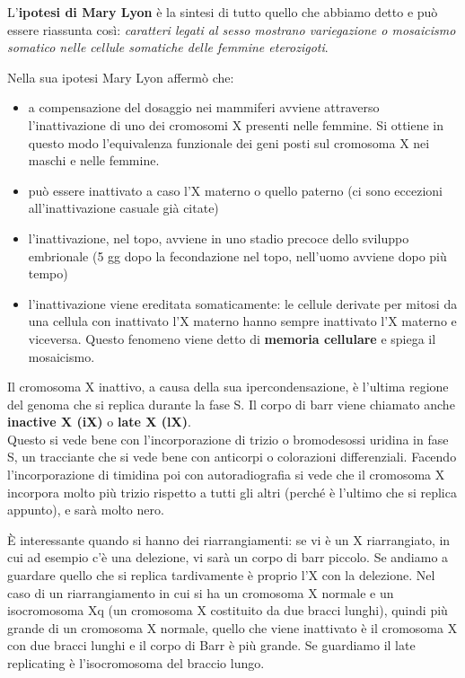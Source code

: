 \documentclass[11pt]{book}
\begin{document}
L’\textbf{ipotesi di Mary Lyon} è la sintesi di tutto quello che abbiamo detto e può essere riassunta così: \emph{caratteri legati al sesso mostrano variegazione o mosaicismo somatico nelle cellule somatiche delle femmine eterozigoti}.

Nella sua ipotesi Mary Lyon affermò che:
\begin{itemize}
\item a compensazione del dosaggio nei mammiferi avviene attraverso l’inattivazione di uno dei cromosomi X presenti nelle femmine. Si ottiene in questo modo l’equivalenza funzionale dei geni posti sul cromosoma X nei maschi e nelle femmine.
\item può essere inattivato a caso l’X materno o quello paterno (ci sono eccezioni all’inattivazione casuale già citate)
\item l’inattivazione, nel topo, avviene in uno stadio precoce dello sviluppo embrionale (5 gg dopo la fecondazione nel topo, nell’uomo avviene dopo più tempo)
\item l’inattivazione viene ereditata somaticamente: le cellule derivate per mitosi da una cellula con inattivato l’X materno hanno sempre inattivato l’X materno e viceversa. Questo fenomeno viene detto di \textbf{memoria cellulare} e spiega il mosaicismo.
\end{itemize}

Il cromosoma X inattivo, a causa della sua ipercondensazione, è l’ultima regione del genoma che si replica durante la fase S. Il corpo di barr viene chiamato anche \textbf{inactive X (iX)} o \textbf{late X (lX)}.\\
Questo si vede bene con l’incorporazione di trizio o bromodesossi uridina in fase S, un tracciante che si vede bene con anticorpi o colorazioni differenziali.
Facendo l’incorporazione di timidina poi con autoradiografia si vede che il cromosoma X incorpora
molto più trizio rispetto a tutti gli altri (perché è l’ultimo che si replica appunto), e sarà molto nero.

È interessante quando si hanno dei riarrangiamenti: se vi è un X riarrangiato, in cui ad esempio c’è una delezione, vi sarà un corpo di barr piccolo. Se andiamo a guardare quello che si replica tardivamente è proprio l’X con la delezione. Nel caso di un riarrangiamento in cui si ha un cromosoma X normale e un isocromosoma Xq (un cromosoma X costituito da due bracci lunghi), quindi più grande di un cromosoma X normale, quello che viene inattivato è il cromosoma X con due bracci lunghi e il corpo di Barr è più grande. Se guardiamo il late replicating è l’isocromosoma del braccio lungo.
\end{document}
